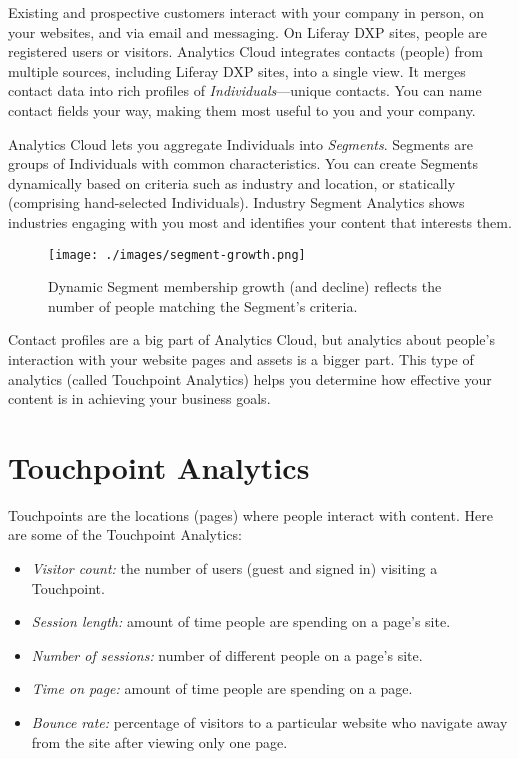 Existing and prospective customers interact with your company in person,
on your websites, and via email and messaging. On Liferay DXP sites,
people are registered users or visitors. Analytics Cloud integrates
contacts (people) from multiple sources, including Liferay DXP sites,
into a single view. It merges contact data into rich profiles of
\emph{Individuals}---unique contacts. You can name contact fields your
way, making them most useful to you and your company.

Analytics Cloud lets you aggregate Individuals into \emph{Segments}.
Segments are groups of Individuals with common characteristics. You can
create Segments dynamically based on criteria such as industry and
location, or statically (comprising hand-selected Individuals). Industry
Segment Analytics shows industries engaging with you most and identifies
your content that interests them.

\begin{figure}
\centering
\texttt{[image: ./images/segment-growth.png]}
\caption{Dynamic Segment membership growth (and decline) reflects the
number of people matching the Segment's criteria.}
\end{figure}

Contact profiles are a big part of Analytics Cloud, but analytics about
people's interaction with your website pages and assets is a bigger
part. This type of analytics (called Touchpoint Analytics) helps you
determine how effective your content is in achieving your business
goals.

\section{Touchpoint Analytics}\label{touchpoint-analytics}

Touchpoints are the locations (pages) where people interact with
content. Here are some of the Touchpoint Analytics:

\begin{itemize}
\item
  \emph{Visitor count:} the number of users (guest and signed in)
  visiting a Touchpoint.
\item
  \emph{Session length:} amount of time people are spending on a page's
  site.
\item
  \emph{Number of sessions:} number of different people on a page's
  site.
\item
  \emph{Time on page:} amount of time people are spending on a page.
\item
  \emph{Bounce rate:} percentage of visitors to a particular website who
  navigate away from the site after viewing only one page.
\end{itemize}

